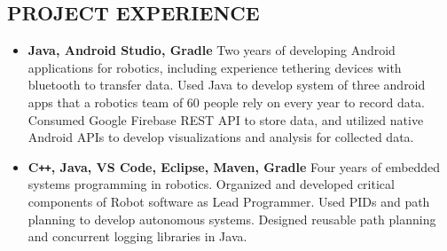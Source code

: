 \documentclass[overlapped]{res}
\begin{document}
\begin{resume}
    \section{PROJECT EXPERIENCE}
    
    \begin{itemize}[label={}]  \itemsep -2pt %
        \item \textbf{Java, Android Studio, Gradle}
              Two years of developing Android applications for robotics, including experience tethering devices with bluetooth to transfer data.
              Used Java to develop system of three android apps that a robotics team of 60 people rely on every year to record data.
              Consumed Google Firebase REST API to store data, and utilized native Android APIs to develop visualizations and analysis for collected data.
        \item \textbf{C\texttt{++}, Java, VS Code, Eclipse, Maven, Gradle}
              Four years of embedded systems programming in robotics. Organized and developed critical components of Robot software as Lead Programmer.
              Used PIDs and path planning to develop autonomous systems. Designed reusable path planning and concurrent logging libraries in Java.
    \end{itemize}
    

\end{resume}
\end{document}
